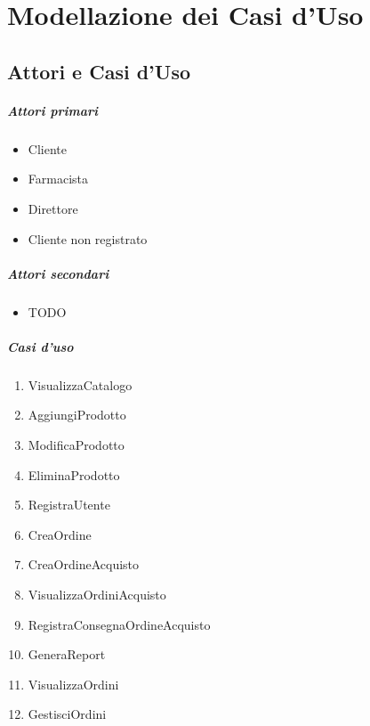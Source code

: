 \chapter{Modellazione dei Casi d'Uso}

\section{Attori e Casi d'Uso}

\paragraph{Attori primari}
\begin{itemize}
	\item Cliente
	\item Farmacista
	\item Direttore
	\item Cliente non registrato
\end{itemize}

\paragraph{Attori secondari}
\begin{itemize}
	\item TODO
\end{itemize}

\paragraph{Casi d'uso}
\begin{enumerate}
	\item VisualizzaCatalogo %
	\item AggiungiProdotto %
	\item ModificaProdotto %
	\item EliminaProdotto %
	\item RegistraUtente %
	\item CreaOrdine %
	\item CreaOrdineAcquisto %
	\item VisualizzaOrdiniAcquisto %
	\item RegistraConsegnaOrdineAcquisto %
	\item GeneraReport %
	\item VisualizzaOrdini %
	\item GestisciOrdini %
\end{enumerate}